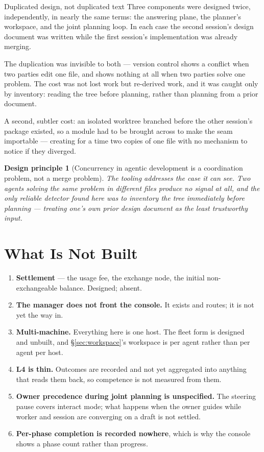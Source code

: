 \documentclass[11pt]{article}
\newtheorem{principle}{Design principle}
\begin{document}
\begin{cautionbox}{Duplicated design, not duplicated text}
Three components were designed twice, independently, in nearly the same terms: the answering plane, the planner's workspace, and the joint planning loop. In each case the second session's design document was written while the first session's implementation was already merging.

The duplication was invisible to both --- version control shows a conflict when two parties edit one file, and shows nothing at all when two parties solve one problem. The cost was not lost work but re-derived work, and it was caught only by inventory: reading the tree before planning, rather than planning from a prior document.
\end{cautionbox}

A second, subtler cost: an isolated worktree branched before the other session's package existed, so a module had to be brought across to make the seam importable --- creating for a time two copies of one file with no mechanism to notice if they diverged.

\begin{principle}[Concurrency in agentic development is a coordination problem, not a merge problem]
\label{prin:concurrency}
The tooling addresses the case it can see. Two agents solving the same problem in different files produce no signal at all, and the only reliable detector found here was to inventory the tree immediately before planning --- treating one's own prior design document as the least trustworthy input.
\end{principle}

\section{What Is Not Built}
\label{sec:notbuilt}

\begin{enumerate}
\item \textbf{Settlement} --- the usage fee, the exchange node, the initial non-exchangeable balance. Designed; absent.
\item \textbf{The manager does not front the console.} It exists and routes; it is not yet the way in.
\item \textbf{Multi-machine.} Everything here is one host. The fleet form is designed~\citep{yang2026account} and unbuilt, and \S\ref{sec:workspace}'s workspace is per agent rather than per agent per host.
\item \textbf{L4 is thin.} Outcomes are recorded and not yet aggregated into anything that reads them back, so competence is not measured from them.
\item \textbf{Owner precedence during joint planning is unspecified.} The steering pause covers interact mode; what happens when the owner guides while worker and session are converging on a draft is not settled.
\item \textbf{Per-phase completion is recorded nowhere}, which is why the console shows a phase count rather than progress.
\end{enumerate}
\end{document}
